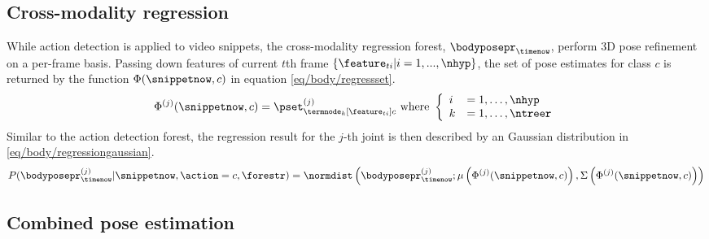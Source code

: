 \subsection{Cross-modality regression}

While action detection is applied to video snippets, the cross-modality regression forest, $\bodyposepr_{\timenow}$, perform 3D pose refinement on a per-frame basis. 
Passing down features of current $t$th frame $\{\feature_{ti}|i = 1,...,\nhyp\}$, the set of pose estimates for class $c$ is returned by the function $\Phi(\snippetnow, c)$ in equation \ref{eq/body/regressset}. 
\begin{equation}
	\label{eq/body/regressset}
	\Phi^{(j)}(\snippetnow, c) = \pset^{(j)}_{\termnode_{k}[\feature_{ti}]c}
	\mbox{ where } 
	\left\{
		\begin{array}{ll}
			i & = 1,\dots,\nhyp \\ 
			k & = 1,\dots,\ntreer
		\end{array}
	\right.
\end{equation} 
Similar to the action detection forest, the regression result for the $j$-th joint is then described by an Gaussian distribution in \ref{eq/body/regressiongaussian}. 
\begin{equation}
	\label{eq/body/regressiongaussian}
	\begin{split}
		P( \bodyposepr_{\timenow}^{(j)}| \snippetnow, \action = c, \forestr) 
		= \normdist\left(\bodyposepr_{\timenow}^{(j)};\mu\left(\Phi^{(j)}(\snippetnow, c)\right),\Sigma\left(\Phi^{(j)}(\snippetnow,c)\right)\right)
\end{split}
\end{equation}

\subsection{Combined pose estimation}

